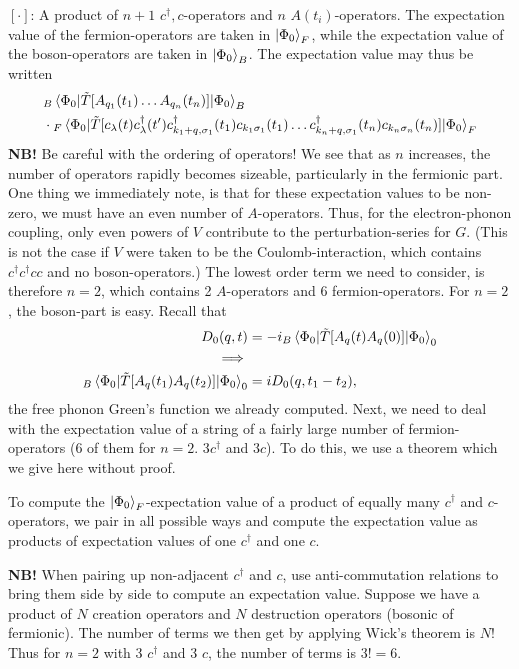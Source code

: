 $[ \cdot ]$: A product of $n+1$ $ c^\dagger, c $-operators and $n$ $A(t_i)$-operators. The expectation value of the fermion-operators are taken in $\ket{\Phi_0}_F$, while the expectation value of the boson-operators are taken in $\ket{\Phi_0}_B$. The expectation value may thus be written
\begin{align*} 
&{}_B\ev{\tilde{T}[A_{q_1}(t_1)\dots A_{q_n}(t_n)]}{\Phi_0}_B\\
& \cdot {}_F\ev{\tilde{T}[c_\lambda(t)c_\lambda^\dagger(t') c_{k_1+q, \sigma_1}^\dagger(t_1) c_{k_1\sigma_1}(t_1)\dots c_{k_n+q, \sigma_1}^\dagger(t_n) c_{k_n\sigma_n}(t_n)]}{\Phi_0}_F
\end{align*}
\textbf{NB!} Be careful with the ordering of operators! We see that as $n$ increases, the number of operators rapidly becomes sizeable, particularly in the fermionic part. One thing we immediately note, is that for these expectation values to be non-zero, we must have an even number of $A$-operators. Thus, for the electron-phonon coupling, only even powers of $ V $ contribute to the perturbation-series for $G$. (This is not the case if $V$ were taken to be the Coulomb-interaction, which contains $c^\dagger c^\dagger c c$ and no boson-operators.)
The lowest order term we need to consider, is therefore $n=2$, which contains 2 $A$-operators and 6 fermion-operators. For $n=2$, the boson-part is easy. Recall that 
\begin{align} 
D_0(q, t) &= -i {}_B\ev{\tilde{T}[A_q(t)A_q(0)]}{\Phi_0}_0 \\
\implies& \\
{}_B\ev{\tilde{T}[A_q(t_1)A_q(t_2)]}{\Phi_0}_0 &= iD_0(q, t_1-t_2),
\end{align}
the free phonon Green's function we already computed. 
Next, we need to deal with the expectation value of a string of a fairly large number of fermion-operators (6 of them for $n=2$. 3$c^\dagger $ and $3 c$).
To do this, we use a theorem which we give here without proof. 
\begin{tcolorbox}[title= Wicks theorem]

To compute the $\ket{\Phi_0}_F$-expectation value of a product of equally many $c^\dagger$ and $c$-operators, we pair in all possible ways and compute the expectation value as products of expectation values of one $c^\dagger$ and one $c$. 
\end{tcolorbox}
\textbf{NB!} When pairing up non-adjacent $c^\dagger $ and $c$, use anti-commutation relations to bring them side by side to compute an expectation value.
Suppose we have a product of $N$ creation operators and $N$ destruction operators (bosonic of fermionic). The number of terms we then get by applying Wick's theorem is $N!$ Thus for $n=2$ with 3 $c^\dagger$ and 3 $c$, the number of terms is $3! =6$. 
